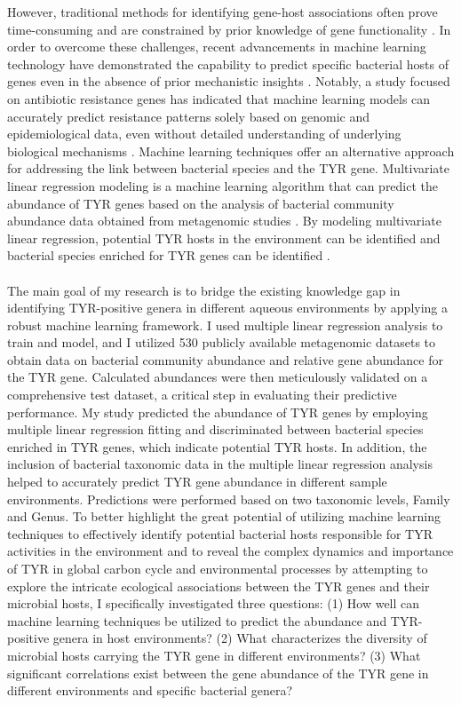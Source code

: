 \documentclass[12pt]{article}
\begin{document}
However, traditional methods for identifying gene-host associations often prove time-consuming and are constrained by prior knowledge of gene functionality \citep{moradigaravand2018prediction,sun2021predicting}. In order to overcome these challenges, recent advancements in machine learning technology have demonstrated the capability to predict specific bacterial hosts of genes even in the absence of prior mechanistic insights \citep{sun2021predicting}. Notably, a study focused on antibiotic resistance genes has indicated that machine learning models can accurately predict resistance patterns solely based on genomic and epidemiological data, even without detailed understanding of underlying biological mechanisms \citep{moradigaravand2018prediction}. Machine learning techniques offer an alternative approach for addressing the link between bacterial species and the TYR gene. Multivariate linear regression modeling is a machine learning algorithm that can predict the abundance of TYR genes based on the analysis of bacterial community abundance data obtained from metagenomic studies \citep{eberly2007multiple}. By modeling multivariate linear regression, potential TYR hosts in the environment can be identified and bacterial species enriched for TYR genes can be identified \citep{eberly2007multiple}.\\\\
The main goal of my research is to bridge the existing knowledge gap in identifying TYR-positive genera in different aqueous environments by applying a robust machine learning framework. I used multiple linear regression analysis to train and model, and I utilized 530 publicly available metagenomic datasets to obtain data on bacterial community abundance and relative gene abundance for the TYR gene. Calculated abundances were then meticulously validated on a comprehensive test dataset, a critical step in evaluating their predictive performance. My study predicted the abundance of TYR genes by employing multiple linear regression fitting and discriminated between bacterial species enriched in TYR genes, which indicate potential TYR hosts. In addition, the inclusion of bacterial taxonomic data in the multiple linear regression analysis helped to accurately predict TYR gene abundance in different sample environments. Predictions were performed based on two taxonomic levels, Family and Genus. To better highlight the great potential of utilizing machine learning techniques to effectively identify potential bacterial hosts responsible for TYR activities in the environment and to reveal the complex dynamics and importance of TYR in global carbon cycle and environmental processes by attempting to explore the intricate ecological associations between the TYR genes and their microbial hosts, I specifically investigated three questions: (1) How well can machine learning techniques be utilized to predict the abundance and TYR-positive genera in host environments? (2) What characterizes the diversity of microbial hosts carrying the TYR gene in different environments? (3) What significant correlations exist between the gene abundance of the TYR gene in different environments and specific bacterial genera?\\\\
\end{document}
